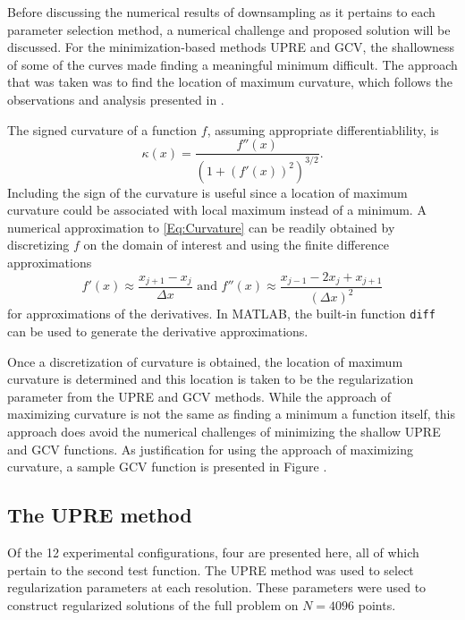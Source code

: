 \documentclass[12pt]{article}
\begin{document}
Before discussing the numerical results of downsampling as it pertains to each parameter selection method, a numerical challenge and proposed solution will be discussed. For the minimization-based methods UPRE and GCV, the shallowness of some of the curves made finding a meaningful minimum difficult. The approach that was taken was to find the location of maximum curvature, which follows the observations and analysis presented in \cite{HansenOLeary}. \par 
The signed curvature of a function $f$, assuming appropriate differentiablility, is
\begin{equation}
\kappa(x) = \frac{f''(x)}{(1+(f'(x))^2)^{3/2}}.
\label{Eq:Curvature}
\end{equation}
Including the sign of the curvature is useful since a location of maximum curvature could be associated with local maximum instead of a minimum. A numerical approximation to \eqref{Eq:Curvature} can be readily obtained by discretizing $f$ on the domain of interest and using the finite difference approximations
\[f'(x) \approx \frac{x_{j+1} - x_{j}}{\Delta{x}} \text{ and } f''(x) \approx \frac{x_{j-1} - 2x_j + x_{j+1}}{(\Delta{x})^2}\]
for approximations of the derivatives. In MATLAB, the built-in function \texttt{diff} can be used to generate the derivative approximations. \par 
Once a discretization of curvature is obtained, the location of maximum curvature is determined and this location is taken to be the regularization parameter from the UPRE and GCV methods. While the approach of maximizing curvature is not the same as finding a minimum a function itself, this approach does avoid the numerical challenges of minimizing the shallow UPRE and GCV functions. As justification for using the approach of maximizing curvature, a sample GCV function is presented in Figure . 

\subsection{The UPRE method} \label{The UPRE method}
Of the 12 experimental configurations, four are presented here, all of which pertain to the second test function. The UPRE method was used to select regularization parameters at each resolution. These parameters were used to construct regularized solutions of the full problem on $N = 4096$ points.
\end{document}
